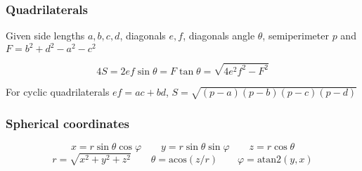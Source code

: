 \subsubsection{Quadrilaterals}

Given side lengths $a, b, c, d$, diagonals $e, f$, diagonals angle $\theta$, semiperimeter $p$ and \mbox{$F = b^2 + d^2 - a^2 - c^2$}

\vspace{-1em}
$$4S = 2ef\sin\theta = F\tan\theta = \sqrt{4e^2f^2 - F^2}$$

For cyclic quadrilaterals $ef = ac + bd$, $S = \sqrt{(p - a)(p - b)(p - c)(p - d)}$

\subsubsection{Spherical coordinates}

$$
x = r \sin \theta \cos \varphi \hspace{2em}
y = r \sin \theta \sin \varphi \hspace{2em}
z = r \cos \theta
$$
$$
r = \sqrt{x^2 + y^2 + z^2} \hspace{2em}
\theta = \text{acos}(z / r) \hspace{2em}
\varphi = \text{atan2}(y, x)
$$
